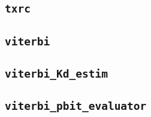 \documentclass[10pt]{article}
\numberwithin{equation}{section}
\begin{document}
\subsection*{\texttt{txrc}}

\subsection*{\texttt{viterbi}}

\subsection*{\texttt{viterbi\_Kd\_estim}}

\subsection*{\texttt{viterbi\_pbit\_evaluator}}

\end{document}
